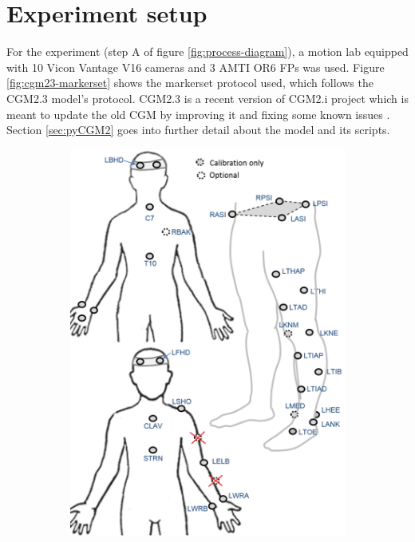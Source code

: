 \documentclass[../main.tex]{subfiles}
\begin{document}
\section{Experiment setup}
For the experiment (step A of figure \ref{fig:process-diagram}), a motion lab equipped with 10 Vicon Vantage V16 cameras and 3 AMTI OR6 \acp{FP} was used. 
Figure \ref{fig:cgm23-markerset} shows the markerset protocol used, which follows the CGM2.3 model's protocol. 
CGM2.3 is a recent version of CGM2.i project which is meant to update the old \ac{CGM} by improving it and fixing some known issues \cite{Leboeuf2019}. 
Section \ref{sec:pyCGM2} goes into further detail about the model and its scripts.
\begin{figure}[!ht]
     \centering
     \begin{subfigure}[t]{0.58\textwidth}
         \centering
         \includegraphics[width=\textwidth]{img/CGM23_markerset.pdf}

\end{subfigure}
\end{figure}
\end{document}
